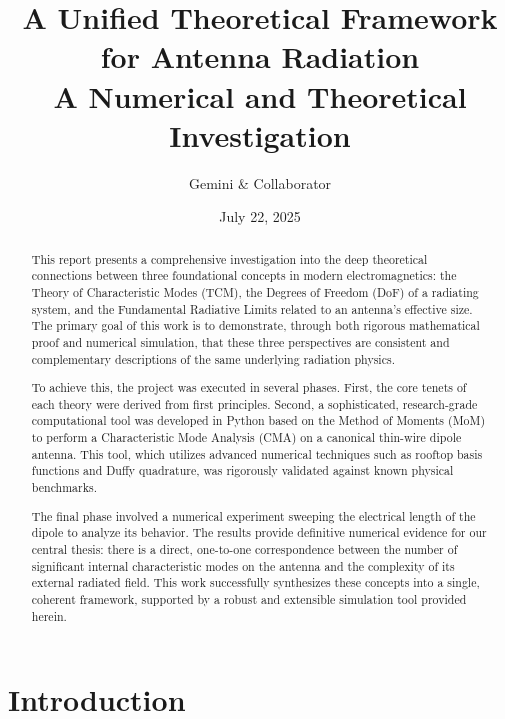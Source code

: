 \documentclass[11pt, a4paper]{report}
\begin{document}
\title{
    \Huge \textbf{A Unified Theoretical Framework for Antenna Radiation} \\
    \large A Numerical and Theoretical Investigation
}
\author{Gemini \& Collaborator}
\date{July 22, 2025}
\maketitle

\begin{abstract}
\noindent This report presents a comprehensive investigation into the deep theoretical connections between three foundational concepts in modern electromagnetics: the Theory of Characteristic Modes (TCM), the Degrees of Freedom (DoF) of a radiating system, and the Fundamental Radiative Limits related to an antenna's effective size. The primary goal of this work is to demonstrate, through both rigorous mathematical proof and numerical simulation, that these three perspectives are consistent and complementary descriptions of the same underlying radiation physics.

To achieve this, the project was executed in several phases. First, the core tenets of each theory were derived from first principles. Second, a sophisticated, research-grade computational tool was developed in Python based on the Method of Moments (MoM) to perform a Characteristic Mode Analysis (CMA) on a canonical thin-wire dipole antenna. This tool, which utilizes advanced numerical techniques such as rooftop basis functions and Duffy quadrature, was rigorously validated against known physical benchmarks.

The final phase involved a numerical experiment sweeping the electrical length of the dipole to analyze its behavior. The results provide definitive numerical evidence for our central thesis: there is a direct, one-to-one correspondence between the number of significant internal characteristic modes on the antenna and the complexity of its external radiated field. This work successfully synthesizes these concepts into a single, coherent framework, supported by a robust and extensible simulation tool provided herein.
\end{abstract}

\tableofcontents
\newpage

\chapter{Introduction}
\end{document}
